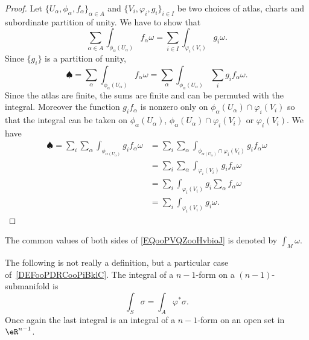 \begin{proof}
    Let \(  \{ U_{\alpha},\phi_{\alpha},f_{\alpha} \}_{\alpha\in A}  \) and \( \{ V_i,\varphi_i,g_i \}_{i\in I}\) be two choices of atlas, charts and subordinate partition of unity. We have to show that
    \begin{equation}        \label{EQooPVQZooHvbioJ}
        \sum_{\alpha\in A}\int_{\phi_{\alpha}(U_{\alpha})}f_{\alpha}\omega=\sum_{i\in I}\int_{\varphi_i(V_i)}g_i\omega.
    \end{equation}
    Since \( \{ g_i \}\) is a partition of unity,
    \begin{equation}
            \spadesuit=\sum_{\alpha}\int_{\phi_{\alpha}(U_{\alpha})}f_{\alpha}\omega=\sum_{\alpha}\int_{\phi_{\alpha}(U_{\alpha})}\sum_ig_if_{\alpha}\omega.
    \end{equation}
    Since the atlas are finite, the sums are finite and can be permuted with the integral. Moreover the function \( g_if_{\alpha}\) is nonzero only on \( \phi_{\alpha}(U_{\alpha})\cap\varphi_i(V_i)\) so that the integral can be taken on \( \phi_{\alpha}(U_{\alpha})\), \( \phi_{\alpha}(U_{\alpha})\cap\varphi_i(V_i)\) or \( \varphi_i(V_i)\). We have
    \begin{subequations}
        \begin{align}
            \spadesuit=\sum_i\sum_{\alpha}\int_{\phi_{\alpha(U_{\alpha})}}g_if_{\alpha}\omega&=  \sum_i\sum_{\alpha}\int_{\phi_{\alpha(U_{\alpha})}\cap \varphi_i(V_i)}g_if_{\alpha}\omega\\
            &=  \sum_i\sum_{\alpha}\int_{\varphi_i(V_i)}g_if_{\alpha}\omega\\
            &= \sum_i\int_{\varphi_i(V_i)}g_i\sum_{\alpha}f_{\alpha}\omega\\
            &=\sum_i\int_{\varphi_i(V_i)}g_i\omega.
        \end{align}
    \end{subequations}
\end{proof}
The common values of both sides of \eqref{EQooPVQZooHvbioJ} is denoted by \( \int_M\omega\).

The following is not really a definition, but a particular case of~\ref{DEFooPDRCooPiBklC}. The integral of a \( n-1\)-form on a \( (n-1)\)-submanifold is
\begin{equation}        \label{EQooYPOGooRYOXQe}
    \int_S\sigma=\int_A\varphi^*\sigma.
\end{equation}
Once again the last integral is an integral of a \( n-1\)-form on an open set in \( \eR^{n-1}\).


